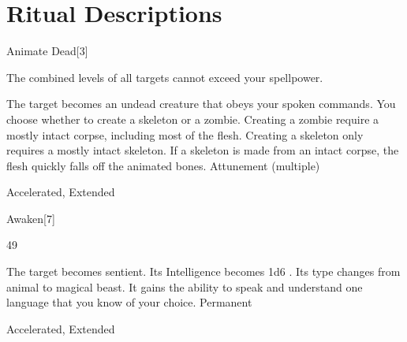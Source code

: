 \section{Ritual Descriptions}
\begin{spellsection}{Animate Dead}[3]
\begin{spellheader}
\end{spellheader}
\begin{spellcontent}
\begin{spelltargetinginfo}
\spellspecial The combined levels of all targets cannot exceed your spellpower.
\end{spelltargetinginfo}
\begin{spelleffects}
\spelleffect
The target becomes an undead creature that obeys your spoken commands.
You choose whether to create a skeleton or a zombie.
Creating a zombie require a mostly intact corpse, including most of the flesh.
Creating a skeleton only requires a mostly intact skeleton.
If a skeleton is made from an intact corpse, the flesh quickly falls off the animated bones.
\spelldur Attunement (multiple)
\end{spelleffects}
\end{spellcontent}
\begin{spellfooter}
 Accelerated, Extended
\end{spellfooter}
\begin{spellsubcontent}
\end{spellsubcontent}
\end{spellsection}
\begin{spellsection}{Awaken}[7]
\begin{spellcontent}
\begin{spelltargetinginfo}
 49
\end{spelltargetinginfo}
\begin{spelleffects}
\spelleffect
The target becomes sentient.
Its Intelligence becomes 1d6 .
Its type changes from animal to magical beast.
It gains the ability to speak and understand one language that you know of your choice.
\spelldur Permanent
\end{spelleffects}
\end{spellcontent}
\begin{spellfooter}
 Accelerated, Extended
\end{spellfooter}
\begin{spellsubcontent}
\end{spellsubcontent}
\end{spellsection}
